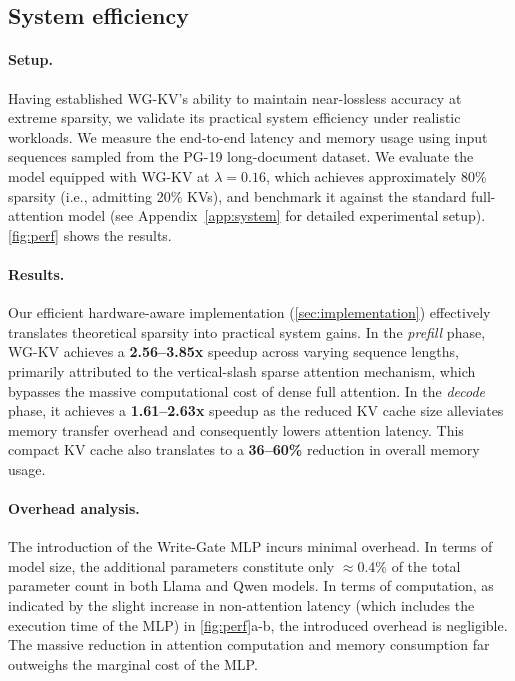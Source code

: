 \subsection{System efficiency}
\label{sec:system_performance}

\paragraph{Setup.} Having established WG-KV's ability to maintain near-lossless accuracy at extreme sparsity, we validate its practical system efficiency under realistic workloads. We measure the end-to-end latency and memory usage using input sequences sampled from the PG-19 \cite{pg19} long-document dataset. We evaluate the model equipped with WG-KV at $\lambda = 0.16$, which achieves approximately 80\% sparsity (i.e., admitting 20\% KVs), and benchmark it against the standard full-attention model (see Appendix~\ref{app:system} for detailed experimental setup). \cref{fig:perf} shows the results.


\paragraph{Results.} Our efficient hardware-aware implementation (\cref{sec:implementation}) effectively translates theoretical sparsity into practical system gains. In the \textit{prefill} phase, WG-KV achieves a \textbf{2.56--3.85x} speedup across varying sequence lengths, primarily attributed to the vertical-slash sparse attention mechanism, which bypasses the massive computational cost of dense full attention. In the \textit{decode} phase, it achieves a \textbf{1.61--2.63x} speedup as the reduced KV cache size alleviates memory transfer overhead and consequently lowers attention latency. This compact KV cache also translates to a \textbf{36--60\%} reduction in overall memory usage.

\paragraph{Overhead analysis.} The introduction of the Write-Gate MLP incurs minimal overhead. In terms of model size, the additional parameters constitute only $\approx$0.4\% of the total parameter count in both Llama and Qwen models. In terms of computation, as indicated by the slight increase in non-attention latency (which includes the execution time of the MLP) in \cref{fig:perf}a-b, the introduced overhead is negligible. The massive reduction in attention computation and memory consumption far outweighs the marginal cost of the MLP.

